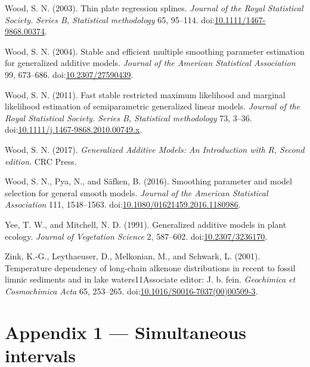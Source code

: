 \documentclass[12pt,]{article}
\begin{document}
\hypertarget{ref-Wood2003-qy}{}
Wood, S. N. (2003). Thin plate regression splines. \emph{Journal of the
Royal Statistical Society. Series B, Statistical methodology} 65,
95--114.
doi:\href{https://doi.org/10.1111/1467-9868.00374}{10.1111/1467-9868.00374}.

\hypertarget{ref-Wood2004-zv}{}
Wood, S. N. (2004). Stable and efficient multiple smoothing parameter
estimation for generalized additive models. \emph{Journal of the
American Statistical Association} 99, 673--686.
doi:\href{https://doi.org/10.2307/27590439}{10.2307/27590439}.

\hypertarget{ref-Wood2011-kn}{}
Wood, S. N. (2011). Fast stable restricted maximum likelihood and
marginal likelihood estimation of semiparametric generalized linear
models. \emph{Journal of the Royal Statistical Society. Series B,
Statistical methodology} 73, 3--36.
doi:\href{https://doi.org/10.1111/j.1467-9868.2010.00749.x}{10.1111/j.1467-9868.2010.00749.x}.

\hypertarget{ref-Wood2017-qi}{}
Wood, S. N. (2017). \emph{Generalized Additive Models: An Introduction
with R, Second edition}. CRC Press.

\hypertarget{ref-Wood2016-fx}{}
Wood, S. N., Pya, N., and Säfken, B. (2016). Smoothing parameter and
model selection for general smooth models. \emph{Journal of the American
Statistical Association} 111, 1548--1563.
doi:\href{https://doi.org/10.1080/01621459.2016.1180986}{10.1080/01621459.2016.1180986}.

\hypertarget{ref-Yee1991-mg}{}
Yee, T. W., and Mitchell, N. D. (1991). Generalized additive models in
plant ecology. \emph{Journal of Vegetation Science} 2, 587--602.
doi:\href{https://doi.org/10.2307/3236170}{10.2307/3236170}.

\hypertarget{ref-Zink2001-cr}{}
Zink, K.-G., Leythaeuser, D., Melkonian, M., and Schwark, L. (2001).
Temperature dependency of long-chain alkenone distributions in recent to
fossil limnic sediments and in lake waters11Associate editor: J. b.
fein. \emph{Geochimica et Cosmochimica Acta} 65, 253--265.
doi:\href{https://doi.org/10.1016/S0016-7037(00)00509-3}{10.1016/S0016-7037(00)00509-3}.

\hypertarget{appendix}{\section*{Appendix 1 --- Simultaneous
intervals}\label{appendix}}
\end{document}
